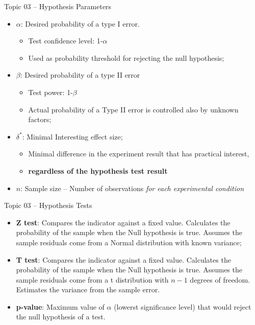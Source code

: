 \begin{frame}[t]{Topic 03 -- Hypothesis Parameters}
  \begin{itemize}
    \item $\alpha$: Desired probability of a type I error.
    \begin{itemize}
      \item Test confidence level: 1-$\alpha$
      \item Used as probability threshold for rejecting the null hypothesis;
    \end{itemize}
    \item $\beta$: Desired probability of a type II error
    \begin{itemize}
      \item Test power: 1-$\beta$
      \item Actual probability of a Type II error is controlled also by unknown factors;
    \end{itemize}
    \item $\delta^*$: Minimal Interesting effect size;
    \begin{itemize}
      \item Minimal difference in the experiment result that has practical interest,
      \item {\bf regardless of the hypothesis test result}
    \end{itemize}
    \item $n$: Sample size -- Number of observations \emph{for each experimental condition}
  \end{itemize}
\end{frame}

\begin{frame}[t]{Topic 03 -- Hypothesis Tests}
  \begin{itemize}
    \item {\bf Z test}: Compares the indicator against a fixed value. Calculates the probability of the sample when the Null hypothesis is true. Assumes the sample residuals come from a Normal distribution with known variance; \bigskip

    \item {\bf T test}: Compares the indicator against a fixed value. Calculates the probability of the sample when the Null hypothesis is true. Assumes the sample residuals come from a t distribution with $n-1$ degrees of freedom. Estimates the variance from the sample error.\bigskip

    \item {\bf p-value}: Maximum value of $\alpha$ (lowerst significance level) that would reject the null hypothesis of a test.
  \end{itemize}
\end{frame}
